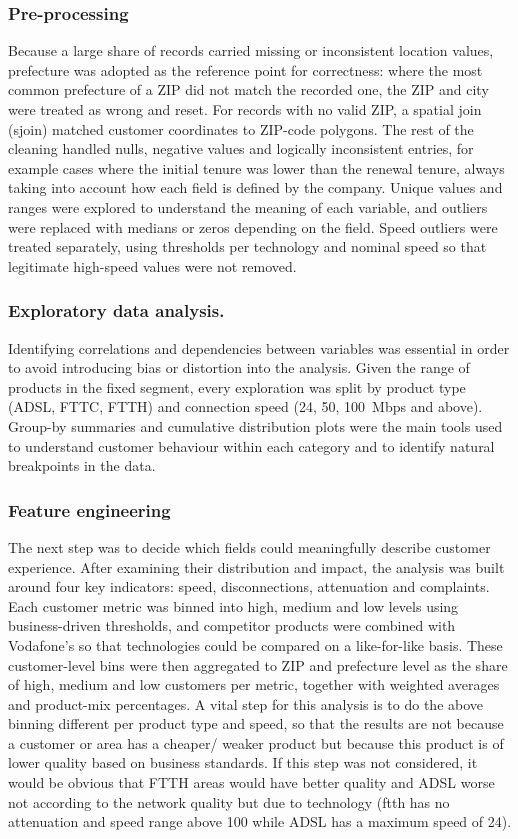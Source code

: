 \documentclass[12pt, a4paper, oneside]{report}
\begin{document}
\subsubsection{Pre-processing} 
Because a large share of records carried missing or inconsistent location values, prefecture was adopted as the reference point for correctness: where the most common prefecture of a ZIP did not match the recorded one, the ZIP and city were treated as wrong and reset. For records with no valid ZIP, a spatial join (sjoin) matched customer coordinates to ZIP-code polygons. The rest of the cleaning handled nulls, negative values and logically inconsistent entries, for example cases where the initial tenure was lower than the renewal tenure, always taking into account how each field is defined by the company. Unique values and ranges were explored to understand the meaning of each variable, and outliers were replaced with medians or zeros depending on the field. Speed outliers were treated separately, using thresholds per technology and nominal speed so that legitimate high-speed values were not removed.

\subsubsection {Exploratory data analysis.}
Identifying correlations and dependencies between variables was essential in order to avoid introducing bias or distortion into the analysis. Given the range of products in the fixed segment, every exploration was split by product type (ADSL, FTTC, FTTH) and connection speed (24, 50, 100~Mbps and above). Group-by summaries and cumulative distribution plots were the main tools used to understand customer behaviour within each category and to identify natural breakpoints in the data.

\subsubsection{Feature engineering} 
The next step was to decide which fields could meaningfully describe customer experience. After examining their distribution and impact, the analysis was built around four key indicators: speed, disconnections, attenuation and complaints. Each customer metric was binned into high, medium and low levels using business-driven thresholds, and competitor products were combined with Vodafone's so that technologies could be compared on a like-for-like basis. These customer-level bins were then aggregated to ZIP and prefecture level as the share of high, medium and low customers per metric, together with weighted averages and product-mix percentages. A vital step for this analysis is to do the above binning different per product type and speed, so that the results are not because a customer or area has a cheaper/ weaker product but because this product is of lower quality based on business standards. If this step was not considered, it would be obvious that FTTH areas would have better quality and ADSL worse not according to the network quality but due to technology (ftth has no attenuation and speed range above 100 while ADSL has a maximum speed of 24).
\end{document}
